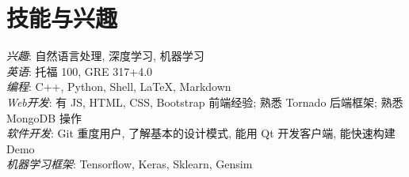 \section{技能与兴趣}
\textit{兴趣}: 自然语言处理, 深度学习, 机器学习\\
\textit{英语}: 托福 100, GRE 317+4.0\\
\textit{编程}: C++, Python, Shell, LaTeX, Markdown\\
\textit{Web开发}: 有 JS, HTML, CSS, Bootstrap 前端经验; 熟悉 Tornado 后端框架; 熟悉 MongoDB 操作\\
\textit{软件开发}: Git 重度用户, 了解基本的设计模式, 能用 Qt 开发客户端, 能快速构建 Demo\\
\textit{机器学习框架}: Tensorflow, Keras, Sklearn, Gensim\\

